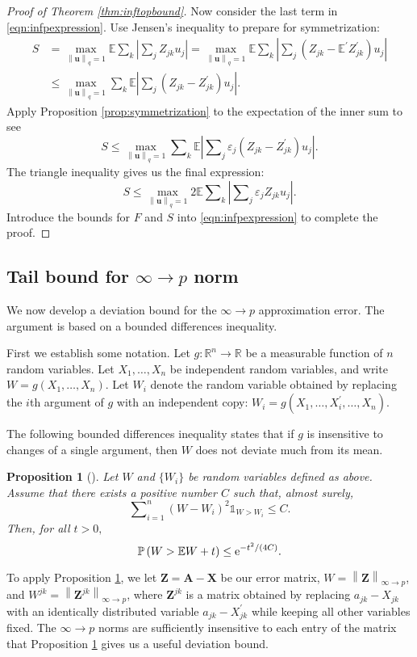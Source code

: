 \documentclass[11pt,letterpaper,twoside,reqno]{amsart}
\newcommand{\e}{\ensuremath{{\rm e}}}
\newcommand{\mat}[1]{\ensuremath{\bm{#1}}}
\newcommand{\E}{\ensuremath{\mathbb{E}}}
\newcommand{\Prob}[1]{\ensuremath{\mathbb{P}\left(#1\right)}}
\newcommand{\R}{\ensuremath{\mathbb{R}}}
\newcommand{\supoverqball}{\ensuremath{\max_{\qnorm{\mat{u}} = 1}}}
\newcommand{\norm}[1]{\ensuremath{\left\|#1\right\|}}
\newcommand{\qnorm}[1]{\ensuremath{\left\|#1\right\|_q}}
\newcommand{\infp}{\ensuremath{\infty\!\rightarrow\!p}}
\newtheorem{prop}{Proposition}
\begin{document}
\begin{proof}[Proof of Theorem \ref{thm:inftopbound}]
Now consider the last term in \eqref{eqn:infpexpression}. Use Jensen's inequality to prepare for symmetrization: 
\[
\begin{split}
S & =\supoverqball\E\sum\nolimits_{k}\left|\sum\nolimits_{j}Z_{jk}u_{j}\right|=\supoverqball\E\sum\nolimits_{k}\left|\sum\nolimits_{j}(Z_{jk}-\E^\prime Z_{jk}^\prime)u_{j}\right|\\
 & \leq\supoverqball\sum\nolimits_{k}\E\left|\sum\nolimits_{j}(Z_{jk}-Z_{jk}^{\prime})u_{j}\right|.
\end{split}
\]
Apply Proposition \ref{prop:symmetrization} to the expectation of the inner sum to see
\[
S\leq\supoverqball\sum\nolimits_{k}\E\left|\sum\nolimits_{j}\varepsilon_{j}(Z_{jk}-Z_{jk}^{\prime})u_{j}\right|.
\]
The triangle inequality gives us the final expression:
\[
S\leq\supoverqball2\E\sum\nolimits_{k}\left|\sum\nolimits_{j}\varepsilon_{j}Z_{jk}u_{j}\right|.
\]
Introduce the bounds for $F$ and $S$ into \eqref{eqn:infpexpression} to complete the proof.
\end{proof}

\subsection{Tail bound for $\infp$ norm}
We now develop a deviation bound for the $\infp$ approximation error. The argument is based on a bounded differences inequality.

First we establish some notation. Let $g:\R^{n}\rightarrow\R$ be a measurable function of $n$ random variables. Let $X_{1},\ldots,X_{n}$ be independent random variables, and write $W=g(X_{1},\ldots,X_{n})$. Let $W_i$ denote the random variable obtained by replacing the $i$th argument of $g$ with an independent copy: $W_{i}=g(X_{1},\dots,X_{i}^{\prime},\ldots,X_{n})$. 

The following bounded differences inequality states that if $g$ is insensitive to changes of a single argument, then $W$ does not deviate much from its mean.
\begin{prop}[]
Let $W$ and $\{W_i\}$ be random variables defined as above. Assume that there exists a positive number $C$ such that, almost surely, 
\[
\sum\nolimits_{i=1}^{n}(W-W_{i})^{2}\mathbb{1}_{W>W_{i}}\leq C.
\]
Then, for all $t>0,$
\[
\Prob{W>\E W+t}\leq \e^{-t^{2}/(4C)}.
\]
\label{prop:logsob}
\end{prop}

To apply Proposition \ref{prop:logsob}, we let $\mat{Z}=\mat{A}-\mat{X}$ be our error matrix, $W=\norm{\mat{Z}}_{\infty\rightarrow p}$, and $W^{jk}=\norm{\mat{Z}^{jk}}_{\infty\rightarrow p}$, where $\mat{Z}^{jk}$ is a matrix obtained by replacing $a_{jk}-X_{jk}$ with an identically
distributed variable $a_{jk}-X_{jk}^{\prime}$ while keeping all other variables fixed. The $\infp$ norms are sufficiently insensitive to each entry of the matrix that Proposition \ref{prop:logsob} gives us a useful deviation bound.
\end{document}
